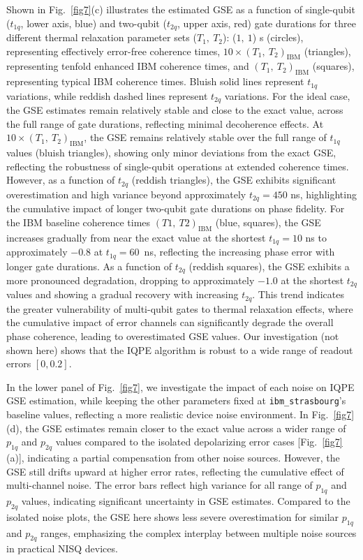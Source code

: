 \documentclass[twocolumn,superscriptaddress,amsmath,amssymb,showpacs,floatfix,preprintnumbers]{revtex4-1}
\newcommand{\ibmstr}{\texttt{ibm\_strasbourg}}
\begin{document}
Shown in Fig.~\ref{fig7}(c) illustrates the estimated GSE as a function of single-qubit
($t_{1q}$, lower axis, blue) and two-qubit ($t_{2q}$, upper axis, red) gate durations for three
different thermal relaxation parameter sets ($T_1,\ T_2$): ($1,\ 1$) s (circles), representing
effectively error-free coherence times, $10 \times (T_1,\ T_2)_\text{IBM}$ (triangles), representing 
tenfold enhanced IBM coherence times, and $(T_1,\ T_2)_\text{IBM}$ (squares), representing 
typical IBM coherence times.
%
Bluish solid lines represent $t_{1q}$ variations, while reddish dashed lines represent $t_{2q}$
variations.
%
For the ideal case, the GSE estimates remain relatively stable and close to the exact value,
across the full range of gate durations, reflecting minimal decoherence effects.
%
At $10 \times (T_1,\ T_2)_\text{IBM}$, the GSE remains relatively stable over the full range
of $t_{1q}$ values (bluish triangles), showing only minor deviations from the exact GSE,
reflecting the robustness of single-qubit operations at extended coherence times. 
%
However, as a function of $t_{2q}$ (reddish triangles), the GSE exhibits significant overestimation
and high variance beyond approximately $t_{2q} = 450$ ns, highlighting the cumulative impact of 
longer two-qubit gate durations on phase fidelity.
%
For the IBM baseline coherence times $(T1,\ T2)_\text{IBM}$ (blue, squares), the GSE increases
gradually from near the exact value at the shortest $t_{1q} = 10$ ns to approximately $-0.8$ at 
$t_{1q} = 60$~ns, reflecting the increasing phase error with longer gate durations.
%
As a function of $t_{2q}$ (reddish squares), the GSE exhibits a more pronounced degradation, 
dropping to approximately $-1.0$ at the shortest $t_{2q}$ values and showing a gradual 
recovery with increasing $t_{2q}$.
%
This trend indicates the greater vulnerability of multi-qubit gates to thermal relaxation effects,
where the cumulative impact of error channels can significantly degrade the overall phase coherence,
leading to overestimated GSE values.
%
Our investigation (not shown here) shows that the IQPE algorithm is robust to a wide range of 
readout errors $[0, 0.2]$.

In the lower panel of Fig.~\ref{fig7}, we investigate the impact of each noise on IQPE GSE estimation, 
while keeping the other parameters fixed at \ibmstr's baseline values, reflecting a more realistic 
device noise environment.
%
In Fig.~\ref{fig7}(d), the GSE estimates remain closer to the exact value across 
a wider range of $p_{1q}$ and $p_{2q}$ values compared to the isolated depolarizing error cases
[Fig.~\ref{fig7}(a)], indicating a partial compensation from other noise sources.
%
However, the GSE still drifts upward at higher error rates, reflecting the cumulative effect of
multi-channel noise.
%
The error bars reflect high variance for all range of $p_{1q}$ and $p_{2q}$ values, indicating significant
uncertainty in GSE estimates.
%
Compared to the isolated noise plots, the GSE here shows less severe overestimation for similar 
$p_{1q}$ and $p_{2q}$ ranges, emphasizing the complex interplay between multiple noise sources in 
practical NISQ devices.
\end{document}
